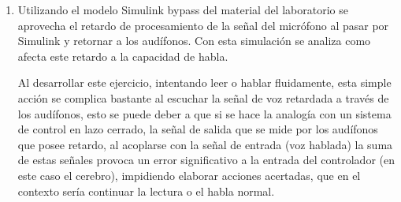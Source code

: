 \begin{enumerate}
\item Utilizando el modelo Simulink bypass del material del laboratorio se aprovecha el retardo de procesamiento de la señal del micrófono al pasar por Simulink y retornar a los  audífonos. Con esta simulación se analiza como afecta este retardo a la capacidad de habla.

Al desarrollar este ejercicio, intentando leer o hablar fluidamente, esta simple acción se complica bastante al escuchar la señal de voz retardada a través de los audífonos,  esto se puede deber a que si se hace la analogía con un sistema de control en lazo cerrado, la señal de salida que se mide por los audífonos que posee retardo,  al acoplarse con la señal de entrada (voz hablada) la suma de estas señales provoca un error significativo a la entrada del controlador (en este caso el cerebro), impidiendo elaborar acciones  acertadas,  que en el contexto sería continuar la lectura o el habla normal.



\end{enumerate}

